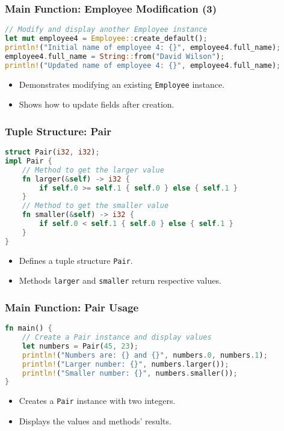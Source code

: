 \documentclass[aspectratio=169, table]{beamer}
\begin{document}
\begin{frame}[fragile]
\frametitle{Main Function: Employee Modification (3)}
\begin{lstlisting}[language=Rust]
// Modify and display another Employee instance
let mut employee4 = Employee::create_default();
println!("Initial name of employee 4: {}", employee4.full_name);
employee4.full_name = String::from("David Wilson");
println!("Updated name of employee 4: {}", employee4.full_name);
\end{lstlisting}
\begin{itemize}
\item Demonstrates modifying an existing \texttt{Employee} instance.
\item Shows how to update fields after creation.
\end{itemize}
\end{frame}


\begin{frame}[fragile]
\frametitle{Tuple Structure: Pair}
\vspace{20pt}
\begin{lstlisting}[language=Rust]
struct Pair(i32, i32);
impl Pair {
	// Method to get the larger value
	fn larger(&self) -> i32 {
		if self.0 >= self.1 { self.0 } else { self.1 }
	}
	// Method to get the smaller value
	fn smaller(&self) -> i32 {
		if self.0 < self.1 { self.0 } else { self.1 }
	}
}
\end{lstlisting}
\begin{itemize}
\item Defines a tuple structure \texttt{Pair}.
\item Methods \texttt{larger} and \texttt{smaller} return respective values.
\end{itemize}
\end{frame}

\begin{frame}[fragile]
\frametitle{Main Function: Pair Usage}
\begin{lstlisting}[language=Rust]
fn main() {
	// Create a Pair instance and display values
	let numbers = Pair(45, 23);
	println!("Numbers are: {} and {}", numbers.0, numbers.1);
	println!("Larger number: {}", numbers.larger());
	println!("Smaller number: {}", numbers.smaller());
}
\end{lstlisting}
\begin{itemize}
\item Creates a \texttt{Pair} instance with two integers.
\item Displays the values and methods' results.
\end{itemize}
\end{frame}
\end{document}
